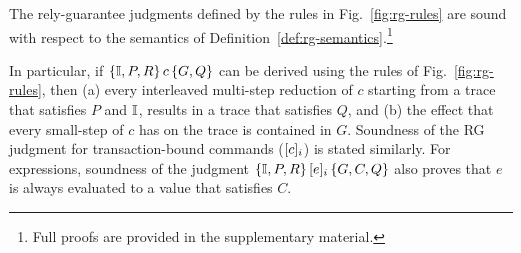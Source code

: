 \begin{theorem} 
The rely-guarantee judgments defined by the rules in
Fig.~\ref{fig:rg-rules} are sound with respect to
the semantics of Definition~\ref{def:rg-semantics}.\footnote{Full proofs are provided in the supplementary material.}
\end{theorem}

\noindent In particular, if $\{\mathbb{I},P,R\}\,c\,\{G,Q\}$ can be derived using
the rules of Fig.~\ref{fig:rg-rules}, then (a) every interleaved
multi-step reduction of $c$ starting from a trace that satisfies $P$
and $\mathbb{I}$, results in a trace that satisfies $Q$, and (b) the effect
that every small-step of $c$ has on the trace is contained in $G$.
Soundness of the RG judgment for transaction-bound commands
($\lbrack c \rbrack_i$) is stated similarly.  For expressions, soundness of
the judgment $\{\mathbb{I},P,R\}\,\lbrack e \rbrack_i\,\{G,C,Q\}$ also proves that $e$
is always evaluated to a value that satisfies $C$.

